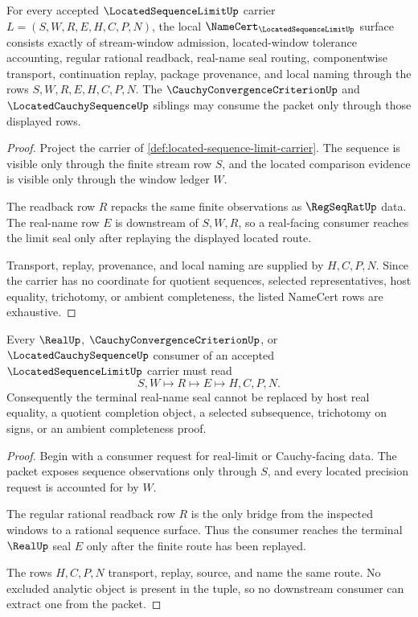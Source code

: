 \begin{theorem}
\label{thm:located-sequence-limit-namecert-obligations}
For every accepted $\LocatedSequenceLimitUp$ carrier $L=(S,W,R,E,H,C,P,N)$, the local $\NameCert_{\LocatedSequenceLimitUp}$ surface consists exactly of stream-window admission, located-window tolerance accounting, regular rational readback, real-name seal routing, componentwise transport, continuation replay, package provenance, and local naming through the rows $S,W,R,E,H,C,P,N$. The $\CauchyConvergenceCriterionUp$ and $\LocatedCauchySequenceUp$ siblings may consume the packet only through those displayed rows.
\end{theorem}
\begin{proof}
Project the carrier of \autoref{def:located-sequence-limit-carrier}. The sequence is visible only through the finite stream row $S$, and the located comparison evidence is visible only through the window ledger $W$.

The readback row $R$ repacks the same finite observations as $\RegSeqRatUp$ data. The real-name row $E$ is downstream of $S,W,R$, so a real-facing consumer reaches the limit seal only after replaying the displayed located route.

Transport, replay, provenance, and local naming are supplied by $H,C,P,N$. Since the carrier has no coordinate for quotient sequences, selected representatives, host equality, trichotomy, or ambient completeness, the listed NameCert rows are exhaustive.
\end{proof}

\begin{theorem}
\label{thm:located-sequence-limit-real-seal-nonescape}
Every $\RealUp$, $\CauchyConvergenceCriterionUp$, or $\LocatedCauchySequenceUp$ consumer of an accepted $\LocatedSequenceLimitUp$ carrier must read
$$
S,W \longmapsto R \longmapsto E \longmapsto H,C,P,N .
$$
Consequently the terminal real-name seal cannot be replaced by host real equality, a quotient completion object, a selected subsequence, trichotomy on signs, or an ambient completeness proof.
\end{theorem}
\begin{proof}
Begin with a consumer request for real-limit or Cauchy-facing data. The packet exposes sequence observations only through $S$, and every located precision request is accounted for by $W$.

The regular rational readback row $R$ is the only bridge from the inspected windows to a rational sequence surface. Thus the consumer reaches the terminal $\RealUp$ seal $E$ only after the finite route has been replayed.

The rows $H,C,P,N$ transport, replay, source, and name the same route. No excluded analytic object is present in the tuple, so no downstream consumer can extract one from the packet.
\end{proof}

